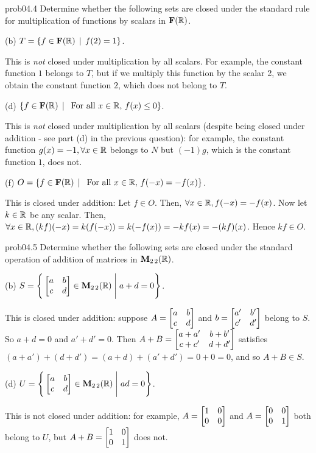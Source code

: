 \begin{sol}{prob04.4} Determine whether  the following sets are closed under the standard rule  for multiplication of functions  by scalars in $\mathbf{F}(\mathbb{R})$. 
\medskip


(b)  $T=\{f \in \mathbf{F}(\mathbb{R}) \,\mid \, f(2)=1  \}$. 

\soln This is {\it not} closed under multiplication by all scalars. For example, the constant function $1$ belongs to $T$, but if we multiply this function by the scalar 2, we obtain the constant function $2$, which does not belong to $T$. \medskip
% 



(d)  $\{f \in \mathbf{F}(\mathbb{R}) \,\mid \, \text{ For all } x\in \mathbb{R},   \, f(x)\le 0 \}$. 

\soln This is {\it not} closed under multiplication by all scalars (despite being closed under addition - see part (d) in the previous question): for example, the constant function $g(x)=-1, \forall x\in \mathbb{R}$ belongs to $N$ but $(-1)g$, which is the constant function $1$, does not.\medskip 
%



(f)  $O=\{f \in \mathbf{F}(\mathbb{R}) \,\mid \, \text{ For all } x\in \mathbb{R},   \, f(-x)= -f(x) \}$. 

\soln This is  closed under addition: Let $f \in O$. Then, $\forall x \in \mathbb{R}, f(-x)= -f(x)$. Now let $k\in \mathbb{R}$ be any scalar. Then, $\forall x \in \mathbb{R}, (kf)(-x)=k (f(-x))=k(-f(x))=-kf(x)=-(kf)(x)$. Hence $kf\in O$. \medskip 
 


\end{sol} 

\begin{sol}{prob04.5} Determine whether   the following sets are closed under the standard operation of addition of matrices in $\mathbf{M}_{2 \,2}(\mathbb{R})$. 
 \medskip





(b)  $S=\Bigg\{  \bmatrix a&b \\c&d\endbmatrix \in \M_{2 \,2}(\R) \;\Bigg|\; a+d=0\Bigg\}$. 

\soln This is closed under addition: suppose $A=\bmatrix a&b\\ c&d\endbmatrix$ and $b=\bmatrix a'&b'\\ c'&d'\endbmatrix$ belong to $S$. So $a+d=0$ and $a'+d'=0$. Then $A+B=\bmatrix a+a'&b+b'\\ c+c'&d+d'\endbmatrix$ satisfies $(a+a')+(d+d')= (a+d) +(a'+d')=0+0=0$, and so $A+B \in S$. \medskip
%




(d)  $U=\Bigg\{  \bmatrix a&b\\ c&d\endbmatrix \in \M_{2 \,2}(\R) \;\Bigg|\; ad=0\Bigg\}$.  

\soln This is not closed under addition: for example, $A=\bmatrix 1&0 \\0&0\endbmatrix$ and  $A=\bmatrix 0&0\\ 0&1\endbmatrix$ both belong to $U$, but $A+B= \bmatrix 1&0\\ 0&1\endbmatrix$ does not.\medskip
%



\end{sol} 

